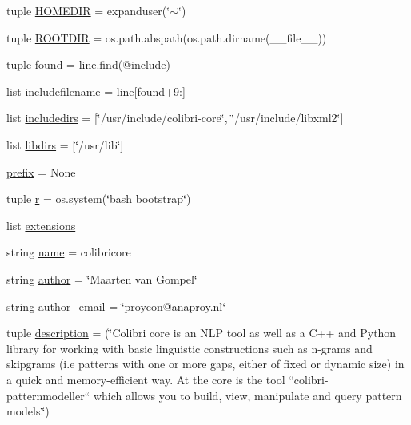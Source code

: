 \begin{DoxyCompactItemize}
\item 
tuple \hyperlink{namespacesetup_a5fe113a6f371a2919041a1bf9b992b22}{H\+O\+M\+E\+D\+I\+R} = expanduser(\char`\"{}$\sim$\char`\"{})
\item 
tuple \hyperlink{namespacesetup_a62a0bb453fa5e76f22937f922ab4ad95}{R\+O\+O\+T\+D\+I\+R} = os.\+path.\+abspath(os.\+path.\+dirname(\+\_\+\+\_\+file\+\_\+\+\_\+))
\item 
tuple \hyperlink{namespacesetup_ae70690c3c654eccddc040793c94421fe}{found} = line.\+find(\textquotesingle{}@include\textquotesingle{})
\item 
list \hyperlink{namespacesetup_afbe58294e6cd18c22164662529495f97}{includefilename} = line\mbox{[}\hyperlink{namespacesetup_ae70690c3c654eccddc040793c94421fe}{found}+9\+:\mbox{]}
\item 
list \hyperlink{namespacesetup_a13490f828556311947276bea73714ae8}{includedirs} = \mbox{[}\char`\"{}/usr/include/colibri-\/core\char`\"{}, \char`\"{}/usr/include/libxml2\char`\"{}\mbox{]}
\item 
list \hyperlink{namespacesetup_ab9de893f1a15246aa1d0172dd4ec87df}{libdirs} = \mbox{[}\char`\"{}/usr/lib\char`\"{}\mbox{]}
\item 
\hyperlink{namespacesetup_a69aaefa467dfdcf65b2d794e63c13139}{prefix} = None
\item 
tuple \hyperlink{namespacesetup_a06ee05034472b3a3588ff7e39df2e4c3}{r} = os.\+system(\char`\"{}bash bootstrap\char`\"{})
\item 
list \hyperlink{namespacesetup_ab6b72d56ff85e52faea3f1487c6904f8}{extensions}
\item 
string \hyperlink{namespacesetup_a61de3710bf6c9d78c0afa352263f8b09}{name} = \textquotesingle{}colibricore\textquotesingle{}
\item 
string \hyperlink{namespacesetup_ac83393287a89728d636e4ae9f4ac914f}{author} = \char`\"{}Maarten van Gompel\char`\"{}
\item 
string \hyperlink{namespacesetup_aa144ac52ed417d5c65d7377e0e75673e}{author\+\_\+email} = \char`\"{}proycon@anaproy.\+nl\char`\"{}
\item 
tuple \hyperlink{namespacesetup_aa4fb878ed283f922b9ad84355a3b7dbf}{description} = (\char`\"{}Colibri core is an N\+L\+P tool as well as a C++ and Python library for working with basic linguistic constructions such as n-\/grams and skipgrams (i.\+e patterns with one or more gaps, either of fixed or dynamic size) in a quick and memory-\/efficient way. At the core is the tool ``colibri-\/patternmodeller`` which allows you to build, view, manipulate and query pattern models.\char`\"{})

\end{DoxyCompactItemize}
